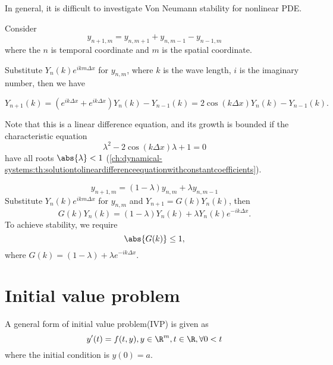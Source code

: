 \begin{refsection}
\begin{remark}
In general, it is difficult to investigate Von Neumann stability for nonlinear PDE.
\end{remark}




\begin{example}
	Consider
$$y_{n+1,m} = y_{n,m+1} + y_{n,m-1} - y_{n-1,m}$$
where the $n$ is temporal coordinate and $m$ is the spatial coordinate. 

Substitute $Y_n(k)e^{ik m \Delta x}$ for $y_{n,m}$, where $k$ is the wave length, $i$ is the imaginary number, then we have

$$Y_{n+1}(k) = (e^{ik\Delta x} + e^{ik\Delta x})Y_n(k) - Y_{n-1}(k) = 2\cos(k\Delta x)Y_n(k) - Y_{n-1}(k).$$

Note that this is a linear difference equation, and its growth is bounded if the characteristic equation
$$\lambda^2 - 2\cos(k\Delta x) \lambda + 1 = 0$$ 
have all roots $\abs{\lambda} < 1$ (\autoref{ch:dynamical-systems:th:solutiontolineardifferenceequationwithconstantcoefficients}). 
\end{example}


\begin{example}
$$y_{n+1,m} = (1-\lambda) y_{n,m} + \lambda y_{n,m-1}$$
Substitute $Y_n(k)e^{ik m \Delta x}$ for $y_{n,m}$ and $Y_{n+1} = G(k)Y_n(k)$, then
$$G(k)Y_{n}(k) = (1-\lambda)Y_n(k) + \lambda Y_n(k) e^{-ik\Delta x}.$$
To achieve stability, we require $$\abs{G(k)}\leq 1,$$
where $G(k) = (1-\lambda) + \lambda e^{-ik\Delta x}$.
\end{example}


\section{Initial value problem}
\begin{definition}
A general form of initial value problem(IVP) is given as
$$y'(t) = f(t,y),y\in \R^m,t\in \R, \forall 0<t$$
where the initial condition is $y(0) = a$.
\end{definition}




\end{refsection}
